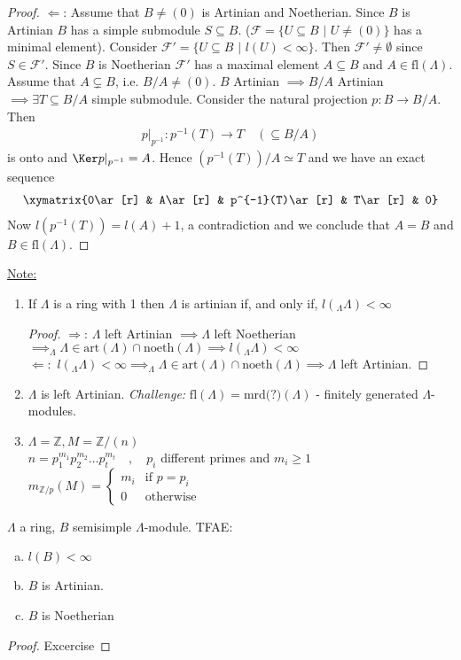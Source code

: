 \begin{proof}
\noindent\underline{\Large\(\Leftarrow\)}: Assume that \(B\neq (0)\) is Artinian and Noetherian. Since \(B\) is Artinian \(B\) has a simple submodule \(S\subseteq B\). (\(\mathcal{F} = \{U\subseteq B\,\, |\,\, U\neq (0)\}\) has a minimal element). Consider \(\mathcal{F}' = \{U\subseteq B\,\, |\,\, l(U) < \infty \}\). Then \(\mathcal{F}' \neq \emptyset\) since \(S\in\mathcal{F}'\). Since \(B\) is Noetherian \(\mathcal{F}'\) has a maximal element \(A\subseteq B\) and \(A \in \text{fl}(\Lambda)\). Assume that \(A\subsetneq B\), i.e. \(B/A\neq (0)\). \(B\) Artinian \(\implies B/A\) Artinian \(\implies \exists T\subseteq B/A\) simple submodule. Consider the natural projection \(p:B\rightarrow B/A\). Then 
\begin{align*}
    p|_{p^{-1}} :p^{-1}(T)\rightarrow T \quad(\subseteq B/A)
\end{align*}
is onto and \(\Ker p|_{p^{-1}} = A\). Hence \((p^{-1}(T))/A\simeq T\) and we have an exact sequence
\begin{align*}
    \xymatrix{0\ar[r] & A\ar[r] & p^{-1}(T)\ar[r] & T\ar[r] & 0}
\end{align*}
Now \(l(p^{-1}(T)) = l(A) + 1\), a contradiction and we conclude that \(A = B\) and \(B\in\text{fl}(\Lambda)\).
\end{proof}
\noindent\underline{Note: } 
\begin{enumerate}[(1)]
    \item If \(\Lambda\) is a ring with 1 then \(\Lambda\) is artinian if, and only if, \(l(_{\Lambda}\Lambda)<\infty\)\\
    \begin{proof} \underline{\(\Rightarrow\)}: \(\Lambda\) left Artinian \(\implies \Lambda\) left Noetherian \(\implies _\Lambda\Lambda\in\text{art}(\Lambda)\cap\text{noeth}(\Lambda)\implies l(_\Lambda\Lambda)<\infty\)\\
    \underline{\(\Leftarrow: \)} \(l(_\Lambda\Lambda) < \infty \implies _\Lambda\Lambda \in \text{art}(\Lambda)\cap\text{noeth}(\Lambda)\implies\Lambda\) left Artinian.
    \end{proof}
    \item \(\Lambda\) is left Artinian. \textit{Challenge:} \(\text{fl}(\Lambda) = \text{mrd(?)}(\Lambda)\) - finitely generated \(\Lambda\)-modules. 
    \item \(\Lambda = \mathbb{Z}, M = \mathbb{Z}/(n)\) \\
    \(n = p_1^{m_1}p_2^{m_2}\dots p_t^{m_t}\quad,\quad p_i\) different primes and \(m_i\geq 1\)\\
    \(m_{\mathbb{Z}/p}(M) = \begin{cases}m_i & \text{if } p = p_i \\ 0 & \text{otherwise}\end{cases}\)
\end{enumerate}
\begin{prop}
    \(\Lambda\) a ring, \(B\) semisimple \(\Lambda\)-module. TFAE:
    \begin{enumerate}[(a)]
        \item \(l(B) <\infty \)
        \item \(B\) is Artinian. 
        \item \(B\) is Noetherian
    \end{enumerate}
\end{prop}
\begin{proof}
    Excercise
\end{proof}
